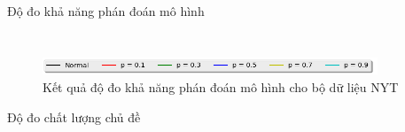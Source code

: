 \documentclass[pdf]{beamer}
\begin{document}
\begin{frame}{Độ đo khả năng phán đoán mô hình}
\begin{columns}[T]
\begin{column}{.50\textwidth}
\begin{figure}
		\end{figure}				
	\end{column} %
\end{columns}
 \begin{figure}
	\begin{center}
		\captionsetup{justification=centering}
		\includegraphics[width=100mm]{menu.png}
		\caption{Kết quả độ đo khả năng phán đoán mô hình cho bộ dữ liệu NYT}
	\end{center}
\end{figure}
\end{frame}


\begin{frame}{Độ đo chất lượng chủ đề }
\begin{columns}[T] %
	\begin{column}{.50\textwidth}
		\begin{figure}
		\end{figure}
	\end{column} %
	\hfill%
	\begin{column}{.50\textwidth}
		\begin{figure}

\end{figure}
\end{column}
\end{columns}
\end{frame}
\end{document}
